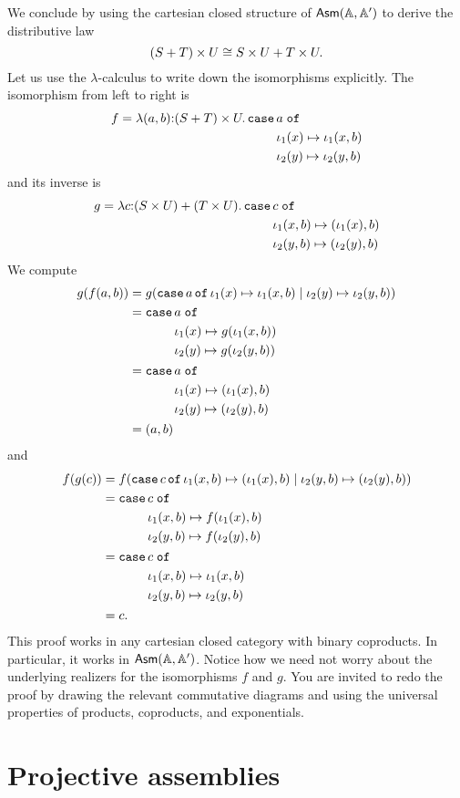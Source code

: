 We conclude by using the cartesian closed structure of $\mathsf{Asm}(\mathbb{A},\mathbb{A}')$ to
derive the distributive law
%
\begin{equation*}
  (S + T) \times U \cong
  S \times U + T \times U.
\end{equation*}
%
Let us use the $\lambda$-calculus to write down the isomorphisms
explicitly. The isomorphism from left to right is
%
\begin{equation*}
  f = \lam{(a,b) \of (\asm{S} + \asm{T}) \times \asm{U}}{
    \xcase{a}
    {\iota_1(x)}{\iota_1(x, b)}
    {\iota_2(y)}{\iota_2(y, b)}
  }
\end{equation*}
%
and its inverse is
%
\begin{equation*}
  g = \lam{c \of (\asm{S} \times \asm{U}) + (\asm{T} \times \asm{U})}{
    \xcase{c}
    {\iota_1(x,b)}{(\iota_1(x), b)}
    {\iota_2(y,b)}{(\iota_2(y), b)}
  }
\end{equation*}
%
We compute
%
\begin{align*}
  g(f(a, b)) &=
  g(\mathtt{case}\,a\,\mathtt{of}\,\iota_1(x) \mapsto \iota_1(x, b) \mid \iota_2(y) \mapsto \iota_2(y, b)) \\
  &=
  \begin{aligned}[t]\mathtt{case}\,&a\;\mathtt{of}\\&\iota_1(x) \mapsto g(\iota_1(x, b)) \\&\iota_2(y) \mapsto g(\iota_2(y, b))\end{aligned} \\
  &=
  \begin{aligned}[t]\mathtt{case}\,&a\;\mathtt{of}\\&\iota_1(x) \mapsto (\iota_1(x), b) \\&\iota_2(y) \mapsto (\iota_2(y), b)\end{aligned} \\
  &=
  (a,b)
\end{align*}
%
and
\begin{align*}
  f(g(c)) &=
  f(
    \mathtt{case}\,c\,\mathtt{of}\,\iota_1(x,b) \mapsto (\iota_1(x), b) \mid \iota_2(y,b) \mapsto (\iota_2(y), b)
  )
  \\
  &=
  \begin{aligned}[t]\mathtt{case}\,&c\;\mathtt{of}\\&\iota_1(x,b) \mapsto f(\iota_1(x), b) \\&\iota_2(y,b) \mapsto f(\iota_2(y), b)\end{aligned}
  \\
  &=
  \begin{aligned}[t]\mathtt{case}\,&c\;\mathtt{of}\\&\iota_1(x,b) \mapsto \iota_1(x, b) \\&\iota_2(y,b) \mapsto \iota_2(y, b)\end{aligned} \\
  &=
  c.
\end{align*}
%
This proof works in any cartesian closed category with binary
coproducts. In particular, it works in $\mathsf{Asm}(\mathbb{A},\mathbb{A}')$. Notice how we need not
worry about the underlying realizers for the isomorphisms $f$ and $g$.
You are invited to redo the proof by drawing the relevant commutative
diagrams and using the universal properties of products, coproducts,
and exponentials.

\section{Projective assemblies}
\label{sec:projective-assemblies}

